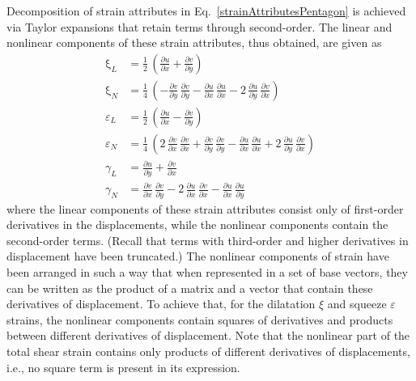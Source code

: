 Decomposition of strain attributes in Eq.~\ref{strainAttributesPentagon} is achieved via Taylor expansions that retain terms through second-order.  The linear and nonlinear components of these strain attributes, thus obtained, are given as
\begin{subequations}
	\begin{align}
		\mathrm \xi_{L} & = \frac{1}{2} \, \left({\frac{\partial u}{\partial x}} + {\frac{\partial v}{\partial y}}\right)\\
		\mathrm \xi_{N} & = \frac{1}{4} \, \left(- {\frac{ \partial v}{\partial y}}\, {\frac{ \partial v}{\partial y}} -{\frac{\partial u}{\partial x}}\, {\frac{\partial u}{\partial x}} - 2 \, {\frac{\partial u}{\partial y}}\, {\frac{\partial v}{\partial x}}\right)\\
		 \varepsilon_{L} & = \frac{1}{2} \, \left({\frac{\partial u}{\partial x}} - {\frac{\partial v}{\partial y}}\right)\\
		 \varepsilon_{N} & = \frac{1}{4} \, \left(2 \, {\frac{ \partial v}{\partial x}}\, {\frac{ \partial v}{\partial x}} + {\frac{ \partial v}{\partial y}}\, {\frac{ \partial v}{\partial y}} -{\frac{\partial u}{\partial x}}\, {\frac{\partial u}{\partial x}} + 2 \, {\frac{\partial u}{\partial y}}\, {\frac{\partial v}{\partial x}}\right)\\
		 \gamma_{L} & = {\frac{\partial u}{\partial y}} + {\frac{\partial v}{\partial x}}\\
		 \gamma_{N} & = {\frac{\partial v}{\partial x}}\, {\frac{\partial v}{\partial y}} - 2\, {\frac{ \partial u}{\partial x}}\, {\frac{ \partial v}{\partial x}} 
		-{\frac{\partial u}{\partial x}}\, {\frac{\partial u}{\partial y}} 
	\end{align}
\end{subequations}
where the linear components of these strain attributes consist only of first-order derivatives in the displacements, while the nonlinear components contain the second-order terms. (Recall that terms with third-order and higher derivatives in displacement have been truncated.) The nonlinear components of strain have been arranged in such a way that when represented in a set of base vectors, they can be written as the product of a matrix and a vector that contain these derivatives of displacement.  To achieve that, for the dilatation $\xi$ and squeeze $\varepsilon$ strains, the nonlinear components contain squares of derivatives and products between different derivatives of displacement. Note that the nonlinear part of the total shear strain contains only products of different derivatives of displacements, i.e., no square term is present in its expression. 

